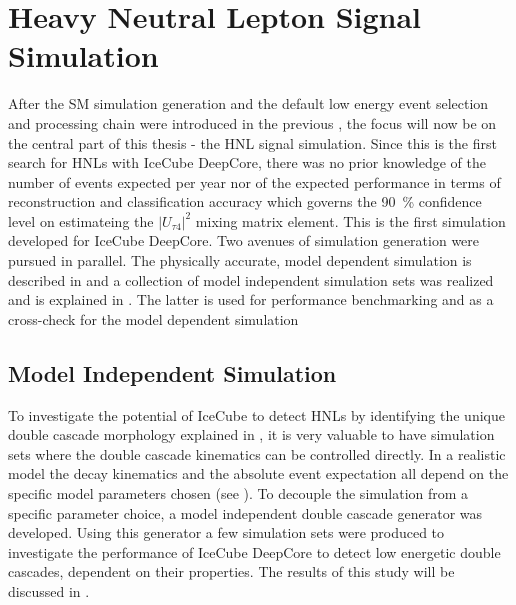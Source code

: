 \setchapterpreamble[u]{\margintoc}

\chapter{Heavy Neutral Lepton Signal Simulation}


After the SM simulation generation and the default low energy event selection and processing chain were introduced in the previous , the focus will now be on the central part of this thesis - the HNL signal simulation. Since this is the first search for HNLs with IceCube DeepCore, there was no prior knowledge of the number of events expected per year nor of the expected performance in terms of reconstruction and classification accuracy which governs the \SI{90}{\percent} confidence level on estimateing the $|U_{\tau4}|^2$ mixing matrix element. This is the first simulation developed for IceCube DeepCore. Two avenues of simulation generation were pursued in parallel. The physically accurate, model dependent simulation is described in  and a collection of model independent simulation sets was realized and is explained in . The latter is used for performance benchmarking and as a cross-check for the model dependent simulation


\section{Model Independent Simulation} 

To investigate the potential of IceCube to detect HNLs by identifying the unique double cascade morphology explained in , it is very valuable to have simulation sets where the double cascade kinematics can be controlled directly. In a realistic model the decay kinematics and the absolute event expectation all depend on the specific model parameters chosen (see ). To decouple the simulation from a specific parameter choice, a model independent double cascade generator was developed. Using this generator a few simulation sets were produced to investigate the performance of IceCube DeepCore to detect low energetic double cascades, dependent on their properties. The results of this study will be discussed in .


